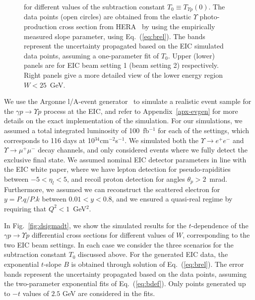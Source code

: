 \documentclass[prd,amsmath,%
twocolumn,floatfix,amssymb, preprintnumbers, linenumbers,nofootinbib, superscriptaddress]{revtex4}
\begin{document}
\begin{figure}
{for different values of the subtraction constant $T_0 \equiv T_{\Upsilon p} (0)$. The data points (open circles) are obtained from the elastic $\Upsilon$ photo-production cross 
section from HERA~\cite{Adloff:2000vm,Breitweg:1998ki,Chekanov:2009zz}
 by using the empirically measured slope parameter, using Eq.~(\ref{eq:brel}). The bands represent the uncertainty propagated based on the EIC simulated  data points, assuming a one-parameter fit of $T_0$. Upper (lower) panels are for EIC beam setting 1 (beam setting 2) respectively. Right panels give a more detailed view of the lower energy region $W < 25$~GeV.}
\label{fig:dsigmadt0}
\end{figure}

We use the Argonne l/A-event generator~\cite{git:lager} to simulate a realistic event sample for the $\gamma p \to \Upsilon p$ process at the EIC, and refer to Appendix~\ref{apx-evgen} for more details on the exact implementation of the simulation. 
For our simulations, we assumed a total integrated luminosity of 100~fb$^{-1}$ for each of the settings, which corresponds to 116 days at 10$^{34}$cm$^{-2}$s$^{-1}$.
We simulated both the $\Upsilon \to e^+e^-$ and $\Upsilon \to \mu^+\mu^-$ decay channels, and only considered events where we fully detect the exclusive final state.
We assumed nominal EIC detector parameters in line with the EIC  white paper, where we have lepton detection for pseudo-rapidities between $-5 < \eta_l < 5$, and recoil proton detection for angles $\theta_p > 2$~mrad. 
Furthermore, we assumed we can reconstruct the scattered electron for 
$y = P.q/P.k$ between $0.01 < y < 0.8$, and we ensured a 
quasi-real regime by requiring that $Q^2 < 1$~GeV$^{2}$.

In Fig.~\ref{fig:dsigmadt}, we show the simulated results for the $t$-dependence of the $\gamma p \to \Upsilon p$ 
differential cross sections for different values of $W$,  
corresponding to the two EIC beam settings. 
In each case we consider the three scenarios for the subtraction constant $T_0$ discussed above. 
For the generated EIC data, the exponential $t$-slope $B$ is obtained through solution of Eq.~(\ref{eq:brel}). 
The error bands represent the uncertainty propagated based on the data points, assuming the two-parameter exponential fits of Eq.~(\ref{eq:bdef}). 
Only points generated up to $-t$ values of $2.5$ GeV are considered in the fits.
\end{document}
